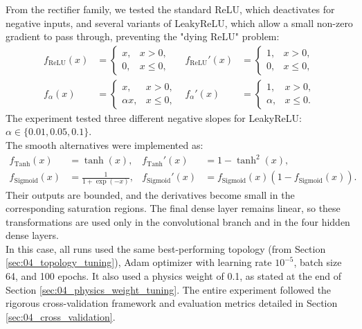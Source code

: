 From the rectifier family, we tested the standard ReLU, which deactivates for negative inputs, and several variants of LeakyReLU, which allow a small non-zero gradient to pass through, preventing the "dying ReLU" problem:
\begin{equation}
\begin{aligned}
    f_{\mathrm{ReLU}}(x)&=\begin{cases}
        x, & x>0,\\
        0, & x\leq0,
    \end{cases}
    & f_{\mathrm{ReLU}}'(x)&=\begin{cases}
        1, & x>0,\\
        0, & x\leq0,
    \end{cases}\\[1ex]
    f_{\alpha}(x)&=\begin{cases}
        x, & x>0,\\
        \alpha x, & x\leq0,
    \end{cases}
    & f_{\alpha}'(x)&=\begin{cases}
        1, & x>0,\\
        \alpha, & x\leq0.
    \end{cases}
\end{aligned}
    \label{eq:04_rectifier_activations}
\end{equation}
The experiment tested three different negative slopes for LeakyReLU: $\alpha\in\{0.01,0.05,0.1\}$.\\

The smooth alternatives were implemented as:
\begin{equation}
\begin{aligned}
    f_{\mathrm{Tanh}}(x)&=\tanh(x),
    & f_{\mathrm{Tanh}}'(x)&=1-\tanh^2(x),\\
    f_{\mathrm{Sigmoid}}(x)&=\frac{1}{1+\exp(-x)},
    & f_{\mathrm{Sigmoid}}'(x)&=f_{\mathrm{Sigmoid}}(x)\left(1-f_{\mathrm{Sigmoid}}(x)\right).
\end{aligned}
    \label{eq:04_saturating_activations}
\end{equation}
Their outputs are bounded, and the derivatives become small in the corresponding saturation regions. The final dense layer remains linear, so these transformations are used only in the convolutional branch and in the four hidden dense layers.\\

In this case, all runs used the same best-performing topology (from Section \ref{sec:04_topology_tuning}), Adam optimizer with learning rate $10^{-5}$, batch size 64, and 100 epochs. It also used a physics weight of 0.1, as stated at the end of Section \ref{sec:04_physics_weight_tuning}. The entire experiment followed the rigorous cross-validation framework and evaluation metrics detailed in Section \ref{sec:04_cross_validation}.\\

